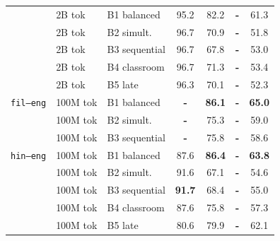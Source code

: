 \begin{table}[t]
\begin{minipage}[t]{0.49\linewidth}
\begin{tabular}{ll l cc cc}
\addlinespace[1.5pt]
 & 2B tok & B1 balanced & \cellcolor[rgb]{0.750,1.000,0.750} 95.2 & \cellcolor[rgb]{0.824,1.000,0.824} 82.2 & \textbf{-} & \cellcolor[rgb]{0.907,1.000,0.907} 61.3 \\
 & 2B tok & B2 simult. & \cellcolor[rgb]{0.742,1.000,0.742} 96.7 & \cellcolor[rgb]{0.886,1.000,0.886} 70.9 & \textbf{-} & \cellcolor[rgb]{0.985,1.000,0.985} 51.8 \\
 & 2B tok & B3 sequential & \cellcolor[rgb]{0.742,1.000,0.742} 96.7 & \cellcolor[rgb]{0.903,1.000,0.903} 67.8 & \textbf{-} & \cellcolor[rgb]{0.975,1.000,0.975} 53.0 \\
 & 2B tok & B4 classroom & \cellcolor[rgb]{0.742,1.000,0.742} 96.7 & \cellcolor[rgb]{0.884,1.000,0.884} 71.3 & \textbf{-} & \cellcolor[rgb]{0.972,1.000,0.972} 53.4 \\
 & 2B tok & B5 late & \cellcolor[rgb]{0.744,1.000,0.744} 96.3 & \cellcolor[rgb]{0.890,1.000,0.890} 70.1 & \textbf{-} & \cellcolor[rgb]{0.981,1.000,0.981} 52.3 \\
\midrule
\texttt{fil--eng} & 100M tok & B1 balanced & \textbf{-} & \cellcolor[rgb]{0.803,1.000,0.803} \textbf{86.1} & \textbf{-} & \cellcolor[rgb]{0.877,1.000,0.877} \textbf{65.0} \\
 & 100M tok & B2 simult. & \textbf{-} & \cellcolor[rgb]{0.862,1.000,0.862} 75.3 & \textbf{-} & \cellcolor[rgb]{0.926,1.000,0.926} 59.0 \\
 & 100M tok & B3 sequential & \textbf{-} & \cellcolor[rgb]{0.859,1.000,0.859} 75.8 & \textbf{-} & \cellcolor[rgb]{0.929,1.000,0.929} 58.6 \\
\midrule
\texttt{hin--eng} & 100M tok & B1 balanced & \cellcolor[rgb]{0.792,1.000,0.792} 87.6 & \cellcolor[rgb]{0.801,1.000,0.801} \textbf{86.4} & \textbf{-} & \cellcolor[rgb]{0.886,1.000,0.886} \textbf{63.8} \\
 & 100M tok & B2 simult. & \cellcolor[rgb]{0.770,1.000,0.770} 91.6 & \cellcolor[rgb]{0.907,1.000,0.907} 67.1 & \textbf{-} & \cellcolor[rgb]{0.962,1.000,0.962} 54.6 \\
 & 100M tok & B3 sequential & \cellcolor[rgb]{0.769,1.000,0.769} \textbf{91.7} & \cellcolor[rgb]{0.900,1.000,0.900} 68.4 & \textbf{-} & \cellcolor[rgb]{0.959,1.000,0.959} 55.0 \\
 & 100M tok & B4 classroom & \cellcolor[rgb]{0.792,1.000,0.792} 87.6 & \cellcolor[rgb]{0.859,1.000,0.859} 75.8 & \textbf{-} & \cellcolor[rgb]{0.940,1.000,0.940} 57.3 \\
 & 100M tok & B5 late & \cellcolor[rgb]{0.831,1.000,0.831} 80.6 & \cellcolor[rgb]{0.837,1.000,0.837} 79.9 & \textbf{-} & \cellcolor[rgb]{0.900,1.000,0.900} 62.1 \\

\end{tabular}
\end{minipage}
\end{table}
